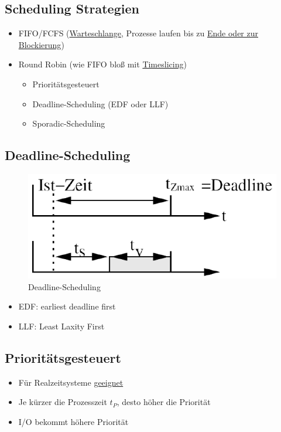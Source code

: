 \subsection{Scheduling Strategien}
\begin{itemize}
	\item FIFO/FCFS (\underline{Warteschlange}, Prozesse laufen bis zu \underline{Ende oder zur Blockierung})
	\item Round Robin (wie FIFO bloß mit \underline{Timeslicing})
	\begin{itemize}
		\item Prioritätsgesteuert
		\item Deadline-Scheduling (EDF oder LLF)
		\item Sporadic-Scheduling
	\end{itemize}
\end{itemize}

\subsection{Deadline-Scheduling}
\begin{figure}[h!]
	\begin{center}
		\includegraphics[width=.3\linewidth]{pics/deadline}
		\caption{Deadline-Scheduling}
	\end{center}
\end{figure}
\begin{itemize}
	\item EDF: earliest deadline first
	\item LLF: Least Laxity First
\end{itemize}

\subsection{Prioritätsgesteuert}
\begin{itemize}
	\item Für Realzeitsysteme \underline{geeignet}
	\item Je kürzer die Prozesszeit $t_P$, desto höher die Priorität
	\item I/O bekommt höhere Priorität
\end{itemize}


